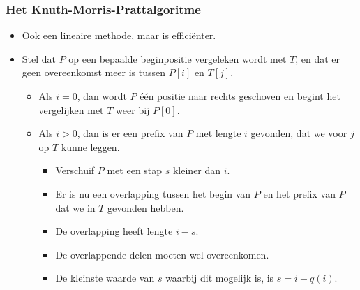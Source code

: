 \subsubsection{Het Knuth-Morris-Prattalgoritme}
\begin{itemize}
    \item Ook een lineaire methode, maar is efficiënter.
    \item Stel dat $P$ op een bepaalde beginpositie vergeleken wordt met $T$, en dat er geen overeenkomst meer is tussen $P[i]$ en $T[j]$.
    \begin{itemize}
        \item Als $i = 0$, dan wordt $P$ één positie naar rechts geschoven en begint het vergelijken met $T$ weer bij $P[0]$.
        \item Als $i > 0$, dan is er een prefix van $P$ met lengte $i$ gevonden, dat we voor $j$ op $T$ kunne leggen.
        \begin{itemize}
            \item Verschuif $P$ met een stap $s$ kleiner dan $i$.
            \item Er is nu een overlapping tussen het begin van $P$ en het prefix van $P$ dat we in $T$ gevonden hebben.
            \item De overlapping heeft lengte $i - s$.
            \item De overlappende delen moeten wel overeenkomen.
            \item De kleinste waarde van $s$ waarbij dit mogelijk is, is $s = i - q(i)$.
        \end{itemize}
    \end{itemize}
\end{itemize}


